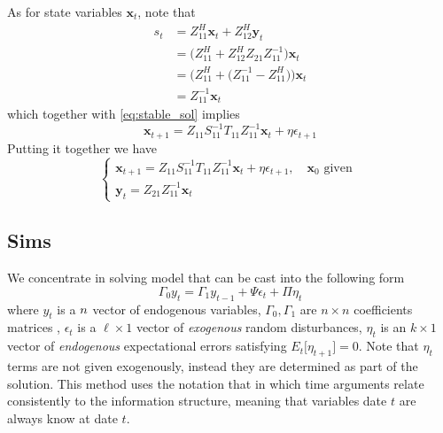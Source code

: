 \documentclass[a4paper,10pt]{article}  %
\begin{document}
As for state variables $ \mathbf{x}_t $, note that
\begin{align*}
   s_t & = Z^H_{11}\mathbf{x}_t + Z^H_{12} \mathbf{y}_t \\
       & = \Big( Z^H_{11} + Z^H_{12} Z_{21}Z_{11}^{-1} \Big) \mathbf{x}_t \\
       & = \bigg( Z^H_{11} + \Big( Z_{11}^{-1} - Z^H_{11} \Big) \bigg) \mathbf{x}_t \\
       & = Z_{11}^{-1} \mathbf{x}_t
\end{align*}
which together with \eqref{eq:stable_sol} implies
\begin{equation*}
   \mathbf{x}_{t+1} = Z_{11} S_{11}^{-1} T_{11} Z_{11}^{-1} \mathbf{x}_t + \eta \epsilon_{t+1}
\end{equation*}
Putting it together we have
\begin{equation}
   \label{eq:solution_klein}
   \begin{cases}
       \mathbf{x}_{t+1} = Z_{11} S_{11}^{-1} T_{11} Z_{11}^{-1}\mathbf{x}_t + \eta \epsilon_{t+1}, \quad \mathbf{x}_0 \text{ given } \\
       \mathbf{y}_t = Z_{21} Z_{11}^{-1} \mathbf{x}_t
   \end{cases}
\end{equation}


\subsection{Sims} %
\label{sub:sims}

We concentrate in solving model that can be cast into the following form
\begin{equation}
   \label{eq:sims_format}
   \Gamma_0 y_t = \Gamma_1 y_{t-1} + \Psi \epsilon_t +\Pi \eta_t
\end{equation}
where $ y_t $ is a $ n\time 1 $ vector of endogenous variables, $ \Gamma_0,\Gamma_1 $ are $ n\times n $ coefficients matrices , $
\epsilon_t $ is a $ \ell\times 1 $ vector of \emph{exogenous} random disturbances, $ \eta_t $ is an $ k\times 1 $ vector of
\emph{endogenous} expectational errors satisfying $ E_t \big[ \eta_{t+1} \big] =0 $. Note that $ \eta_t $ terms are not given
exogenously, instead they are determined as part of the solution. This method uses the notation that in which time arguments relate
consistently to the information structure, meaning that variables date $ t $ are always know at date $ t $.
\end{document}
